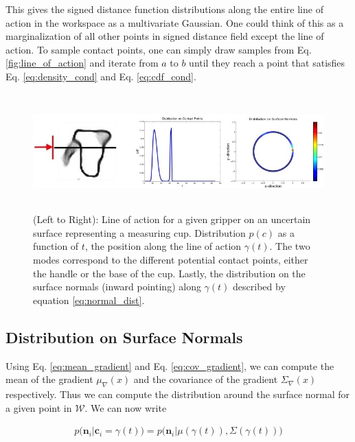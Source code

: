 \documentclass[letterpaper, 10 pt, conference]{ieeeconf}  %
\begin{document}
This gives the signed distance function distributions along the entire line of action in the workspace as a multivariate Gaussian. One could think of this as a marginalization of all other points in signed distance field except the line of action. To sample contact points, one can simply draw samples from Eq. \ref{fig:line_of_action} and iterate from $a$ to $b$ until they reach a point that satisfies  Eq. \ref{eq:density_cond} and Eq. \ref{eq:cdf_cond}. 

\begin{figure}[ht!]
\centering
\includegraphics[width = 17cm, height = 4.5cm]{figures/Slide04.jpg}
\caption{ \footnotesize (Left to Right): Line of action for a given gripper on an uncertain surface representing a measuring cup. Distribution $p(c)$ as a function of $t$, the position along the line of action $\gamma(t)$. The two modes correspond to the different potential contact points, either the handle or the base of the cup. Lastly, the distribution on the surface normals (inward pointing) along $\gamma(t)$ described by equation \ref{eq:normal_dist}. }
\vspace*{-10pt}
\label{fig:GraspDist}
\end{figure}



\subsection{Distribution on Surface Normals}\label{sec:normals} 
Using Eq. \ref{eq:mean_gradient} and Eq. \ref{eq:cov_gradient}, we can compute the mean of the gradient $ \mu_{\nabla}(x)$ and the covariance of the gradient $\Sigma_{\nabla}(x)$ respectively. Thus we can compute the distribution around the surface normal for a given point in $\mathcal{W}$. We can now write 

\vspace{-2ex}
\begin{align*}
p\big(\textbf{n}_i|\textbf{c}_i = \gamma(t)\big) = p\big(\textbf{n}_i |\mu(\gamma(t)), \Sigma(\gamma(t)) \big)
\end{align*}
\end{document}
